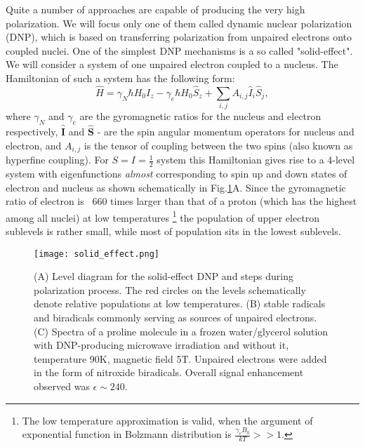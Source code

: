 \documentclass[a4paper, 12pt]{article}
\begin{document}
  Quite a number of approaches are capable of producing the very high polarization. We will focus only one of them called dynamic nuclear polarization (DNP), which is based on transferring polarization from unpaired electrons onto coupled nuclei. One of the simplest DNP mechanisms is a so called "solid-effect". We will consider a system of one unpaired electron coupled to a nucleus. The Hamiltonian of such a system has the following form:
  \begin{equation}
  \hat H = \gamma_N \hbar H_0 I_z - \gamma_e \hbar H_0 \hat{S}_{z} + \sum_{i,j}A_{i,j} \hat{I}_{i} \hat{S}_{j},
  \end{equation}
where $\gamma_N$ and $\gamma_e$ are the gyromagnetic ratios for the nucleus and electron respectively, $\bm{\hat{I}}$ and $\bm{\hat{S}}$ - are the spin angular momentum operators for nucleus and electron, and $A_{i,j}$ is the tensor of coupling between the two spins (also known as hyperfine coupling). For $S=I=\frac{1}{2}$ system this Hamiltonian gives rise to a 4-level system with eigenfunctions \textit{almost} corresponding to spin up and down states of electron and nucleus as shown schematically in Fig.\ref{fig:solid_effect}A. Since the gyromagnetic ratio of electron is ~660 times larger than that of a proton (which has the highest among all nuclei) at low temperatures \footnote{ The low temperature approximation is valid, when the argument of exponential function in Bolzmann distribution is $\frac{\gamma_e B_0}{k T}>>1$.} the population of upper electron sublevels is rather small, while most of population sits in the lowest sublevels.

\begin{figure}[ht]
\caption{(A) Level diagram for the solid-effect DNP and steps during polarization process. The red circles on the levels schematically denote relative populations at low temperatures. (B) stable radicals and biradicals commonly serving as sources of unpaired electrons. (C) Spectra of a proline molecule in a frozen water/glycerol solution with DNP-producing microwave irradiation and without it, temperature 90K, magnetic field 5T. Unpaired electrons were added in the form of nitroxide biradicals. Overall signal enhancement observed was $\epsilon \sim 240$.}
\label{fig:solid_effect}
\centering
\texttt{[image: solid\_effect.png]}
\end{figure}
  
\end{document}
